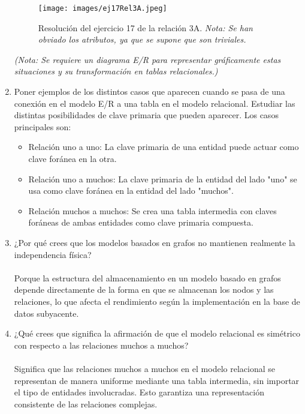 \begin{enumerate}[label=\textbf{\arabic*.}, itemsep=0.5em]
    \begin{figure}[H]
        \centering
        \texttt{[image: images/ej17Rel3A.jpeg]}
        \caption{Resolución del ejercicio 17 de la relación 3A. \textit{Nota: Se han obviado los atributos, ya que se supone que son triviales.}}
        \label{fig:diagrama_2}
    \end{figure}


    \textit{(Nota: Se requiere un diagrama E/R para representar gráficamente estas situaciones y su transformación en tablas relacionales.)}

    \item Poner ejemplos de los distintos casos que aparecen cuando se pasa de una conexión en el modelo E/R a una tabla en el modelo relacional. Estudiar las distintas posibilidades de clave primaria que pueden aparecer.  
    Los casos principales son:
    \begin{itemize}
        \item Relación uno a uno: La clave primaria de una entidad puede actuar como clave foránea en la otra.
        \item Relación uno a muchos: La clave primaria de la entidad del lado "uno" se usa como clave foránea en la entidad del lado "muchos".
        \item Relación muchos a muchos: Se crea una tabla intermedia con claves foráneas de ambas entidades como clave primaria compuesta.
    \end{itemize}

    \item ¿Por qué crees que los modelos basados en grafos no mantienen realmente la independencia física?  \\\\
    Porque la estructura del almacenamiento en un modelo basado en grafos depende directamente de la forma en que se almacenan los nodos y las relaciones, lo que afecta el rendimiento según la implementación en la base de datos subyacente.

    \item ¿Qué crees que significa la afirmación de que el modelo relacional es simétrico con respecto a las relaciones muchos a muchos?  \\\\
    Significa que las relaciones muchos a muchos en el modelo relacional se representan de manera uniforme mediante una tabla intermedia, sin importar el tipo de entidades involucradas. Esto garantiza una representación consistente de las relaciones complejas.


\end{enumerate}
